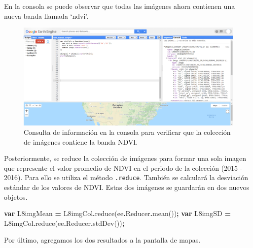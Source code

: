 \documentclass[
  12pt,
  letterpaper,
  twoside]{book}
\newenvironment{Shaded}{\begin{snugshade}}{\end{snugshade}}
\newcommand{\AttributeTok}[1]{\textcolor[rgb]{0.77,0.63,0.00}{#1}}
\newcommand{\FunctionTok}[1]{\textcolor[rgb]{0.00,0.00,0.00}{#1}}
\newcommand{\KeywordTok}[1]{\textcolor[rgb]{0.13,0.29,0.53}{\textbf{#1}}}
\newcommand{\NormalTok}[1]{#1}
\newcommand{\OperatorTok}[1]{\textcolor[rgb]{0.81,0.36,0.00}{\textbf{#1}}}
\begin{document}
En la consola se puede observar que todas las imágenes ahora contienen una nueva banda llamada `ndvi'.

\begin{figure}

{\centering \includegraphics[width=1\linewidth]{Img/imConNDVI} 

}

\caption{Consulta de información en la consola para verificar que la colección de imágenes contiene la banda NDVI.}\label{fig:unnamed-chunk-155}
\end{figure}

Posteriormente, se reduce la colección de imágenes para formar una sola imagen que represente el valor promedio de NDVI en el periodo de la colección (2015 - 2016). Para ello se utiliza el método \texttt{.reduce}. También se calculará la desviación estándar de los valores de NDVI. Estas dos imágenes se guardarán en dos nuevos objetos.

\begin{Shaded}
\begin{Highlighting}[]
\KeywordTok{var}\NormalTok{ L8imgMean }\OperatorTok{=}\NormalTok{ L8imgCol}\OperatorTok{.}\FunctionTok{reduce}\NormalTok{(ee}\OperatorTok{.}\AttributeTok{Reducer}\OperatorTok{.}\FunctionTok{mean}\NormalTok{())}\OperatorTok{;}
\KeywordTok{var}\NormalTok{ L8imgSD }\OperatorTok{=}\NormalTok{ L8imgCol}\OperatorTok{.}\FunctionTok{reduce}\NormalTok{(ee}\OperatorTok{.}\AttributeTok{Reducer}\OperatorTok{.}\FunctionTok{stdDev}\NormalTok{())}\OperatorTok{;}
\end{Highlighting}
\end{Shaded}

Por último, agregamos los dos resultados a la pantalla de mapas.
\end{document}
